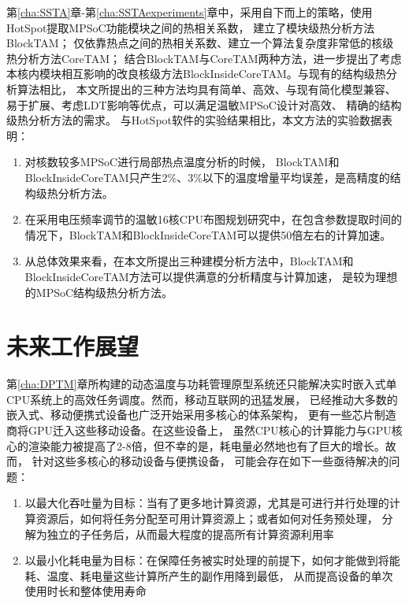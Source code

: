第\ref{cha:SSTA}章-第\ref{cha:SSTAexperiments}章中，采用自下而上的策略，使用HotSpot提取MPSoC功能模块之间的热相关系数， 建立了模块级热分析方法BlockTAM； 仅依靠热点之间的热相关系数、建立一个算法复杂度非常低的核级热分析方法CoreTAM； 结合BlockTAM与CoreTAM两种方法，进一步提出了考虑本核内模块相互影响的改良核级方法BlockInsideCoreTAM。与现有的结构级热分析算法相比， 本文所提出的三种方法均具有简单、高效、与现有简化模型兼容、易于扩展、考虑LDT影响等优点，可以满足温敏MPSoC设计对高效、 精确的结构级热分析方法的需求。
与HotSpot软件的实验结果相比，本文方法的实验数据表明：
\begin{enumerate}[1)]
\item 对核数较多MPSoC进行局部热点温度分析的时候， BlockTAM和BlockInsideCoreTAM只产生2\%、3\%以下的温度增量平均误差，是高精度的结构级热分析方法。
\item 在采用电压频率调节的温敏16核CPU布图规划研究中，在包含参数提取时间的情况下，BlockTAM和BlockInsideCoreTAM可以提供50倍左右的计算加速。
\item 从总体效果来看，在本文所提出三种建模分析方法中，BlockTAM和BlockInsideCoreTAM方法可以提供满意的分析精度与计算加速， 是较为理想的MPSoC结构级热分析方法。
\end{enumerate} 

\section{未来工作展望}
第\ref{cha:DPTM}章所构建的动态温度与功耗管理原型系统还只能解决实时嵌入式单CPU系统上的高效任务调度。然而，移动互联网的迅猛发展， 已经推动大多数的嵌入式、移动便携式设备也广泛开始采用多核心的体系架构， 更有一些芯片制造商将GPU迁入这些移动设备。在这些设备上， 虽然CPU核心的计算能力与GPU核心的渲染能力被提高了2-8倍，但不幸的是，耗电量必然地也有了巨大的增长。故而， 针对这些多核心的移动设备与便携设备， 可能会存在如下一些亟待解决的问题：
\begin{enumerate}[1)]
\item 以最大化吞吐量为目标：当有了更多地计算资源，尤其是可进行并行处理的计算资源后，如何将任务分配至可用计算资源上；或者如何对任务预处理， 分解为独立的子任务后，从而最大程度的提高所有计算资源利用率
\item 以最小化耗电量为目标：在保障任务被实时处理的前提下，如何才能做到将能耗、温度、耗电量这些计算所产生的副作用降到最低， 从而提高设备的单次使用时长和整体使用寿命
\end{enumerate}

